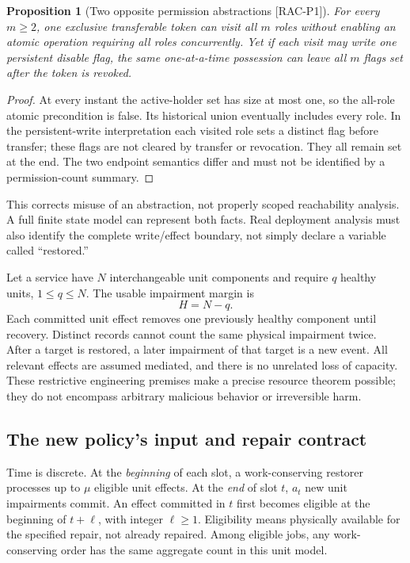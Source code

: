\documentclass[11pt,a4paper]{article}
\newtheorem{proposition}[theorem]{Proposition}
\theoremstyle{definition}\newtheorem{definition}{Definition}
\newcommand{\idtag}[1]{\textnormal{\textsf{[#1]}}}
\begin{document}
\begin{proposition}[Two opposite permission abstractions \idtag{RAC-P1}]
For every $m\ge2$, one exclusive transferable token can visit all $m$ roles without enabling an atomic operation requiring all roles concurrently. Yet if each visit may write one persistent disable flag, the same one-at-a-time possession can leave all $m$ flags set after the token is revoked.
\end{proposition}
\begin{proof}
At every instant the active-holder set has size at most one, so the all-role atomic precondition is false. Its historical union eventually includes every role. In the persistent-write interpretation each visited role sets a distinct flag before transfer; these flags are not cleared by transfer or revocation. They all remain set at the end. The two endpoint semantics differ and must not be identified by a permission-count summary.
\end{proof}
This corrects misuse of an abstraction, not properly scoped reachability analysis. A full finite state model can represent both facts. Real deployment analysis must also identify the complete write/effect boundary, not simply declare a variable called ``restored.''

Let a service have $N$ interchangeable unit components and require $q$ healthy units, $1\le q\le N$. The usable impairment margin is
\begin{equation} H=N-q.\end{equation}
Each committed unit effect removes one previously healthy component until recovery. Distinct records cannot count the same physical impairment twice. After a target is restored, a later impairment of that target is a new event. All relevant effects are assumed mediated, and there is no unrelated loss of capacity. These restrictive engineering premises make a precise resource theorem possible; they do not encompass arbitrary malicious behavior or irreversible harm.

\subsection{The new policy's input and repair contract}
Time is discrete. At the \emph{beginning} of each slot, a work-conserving restorer processes up to $\mu$ eligible unit effects. At the \emph{end} of slot $t$, $a_t$ new unit impairments commit. An effect committed in $t$ first becomes eligible at the beginning of $t+\ell$, with integer $\ell\ge1$. Eligibility means physically available for the specified repair, not already repaired. Among eligible jobs, any work-conserving order has the same aggregate count in this unit model.
\end{document}
